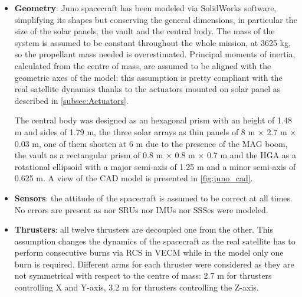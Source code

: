 \begin{itemize}
    \item
    \begin{minipage}[t]{0.723\linewidth}
        \textbf{Geometry}: Juno spacecraft has been modeled via SolidWorks software, simplifying its shapes but conserving the general dimensions, in particular the size of the solar panels, the vault and the central body. The mass of the system is assumed to be constant throughout the whole mission, at 3625 kg, so the propellant mass needed is overestimated.
        Principal moments of inertia, calculated from the centre of mass, are assumed to be aligned with the geometric axes of the model: this assumption is pretty compliant with the real satellite dynamics thanks to the actuators mounted on solar panel as described in \autoref{subsec:Actuators}. 
       
        The central body was designed as an hexagonal prism with an height of 1.48 m and sides of 1.79 m, the three solar arrays as thin panels of 8 m $\times$ 2.7 m $\times$ 0.03 m, one of them shorten at 6 m due to the presence of the MAG boom, the vault as a rectangular prism of 0.8 m $\times$ 0.8 m $\times$ 0.7 m and the HGA as a rotational ellipsoid with a major semi-axis of 1.25 m and a minor semi-axis of 0.625 m. 
        A view of the CAD model is presented in \autoref{fig:juno_cad}.
    \end{minipage}\hfill
    \begin{minipage}[t]{0.277\linewidth}
        \vspace*{-10mm}
    \end{minipage}
    \item \textbf{Sensors}: the attitude of the spacecraft is assumed to be correct at all times. No errors are present as nor SRUs nor IMUs nor SSSes were modeled. 
    
    \item \textbf{Thrusters}: all twelve thrusters are decoupled one from the other. This assumption changes the dynamics of the spacecraft as the real satellite has to perform consecutive burns via RCS in VECM while in the model only one burn is required. 
    Different arms for each thruster were considered as they are not symmetrical with respect to the centre of mass: 2.7 m for thrusters controlling X and Y-axis, 3.2 m for thrusters controlling the Z-axis.


\end{itemize}
